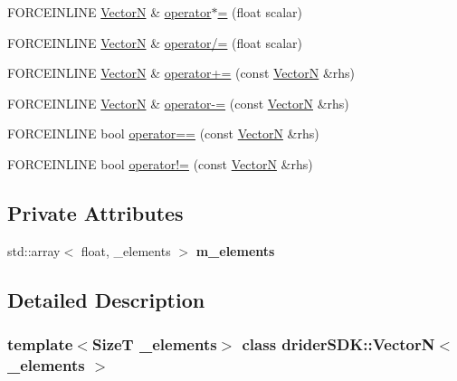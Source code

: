 \begin{DoxyCompactItemize}
\item 
F\+O\+R\+C\+E\+I\+N\+L\+I\+NE \hyperlink{classdrider_s_d_k_1_1_vector_n}{VectorN} \& \hyperlink{classdrider_s_d_k_1_1_vector_n_a9a4739551cb0d3809b77432213dc174e}{operator$\ast$=} (float scalar)
\item 
F\+O\+R\+C\+E\+I\+N\+L\+I\+NE \hyperlink{classdrider_s_d_k_1_1_vector_n}{VectorN} \& \hyperlink{classdrider_s_d_k_1_1_vector_n_accaaea8ae68ab302ab373087d453535e}{operator/=} (float scalar)
\item 
F\+O\+R\+C\+E\+I\+N\+L\+I\+NE \hyperlink{classdrider_s_d_k_1_1_vector_n}{VectorN} \& \hyperlink{classdrider_s_d_k_1_1_vector_n_aeced03636e133a2622be3440ae01af63}{operator+=} (const \hyperlink{classdrider_s_d_k_1_1_vector_n}{VectorN} \&rhs)
\item 
F\+O\+R\+C\+E\+I\+N\+L\+I\+NE \hyperlink{classdrider_s_d_k_1_1_vector_n}{VectorN} \& \hyperlink{classdrider_s_d_k_1_1_vector_n_afa5153ab687f62e42974889f9f3b4b16}{operator-\/=} (const \hyperlink{classdrider_s_d_k_1_1_vector_n}{VectorN} \&rhs)
\item 
F\+O\+R\+C\+E\+I\+N\+L\+I\+NE bool \hyperlink{classdrider_s_d_k_1_1_vector_n_a29db976f9adbfcbee7f88ed80dc039cc}{operator==} (const \hyperlink{classdrider_s_d_k_1_1_vector_n}{VectorN} \&rhs)
\item 
F\+O\+R\+C\+E\+I\+N\+L\+I\+NE bool \hyperlink{classdrider_s_d_k_1_1_vector_n_a3cddf30e8751d5d6f926252e169979d2}{operator!=} (const \hyperlink{classdrider_s_d_k_1_1_vector_n}{VectorN} \&rhs)
\end{DoxyCompactItemize}
\subsection*{Private Attributes}
\begin{DoxyCompactItemize}
\item 
\mbox{\label{classdrider_s_d_k_1_1_vector_n_a127175ab6bcccd0c12590f92db70da4f}} 
std\+::array$<$ float, \+\_\+elements $>$ {\bfseries m\+\_\+elements}
\end{DoxyCompactItemize}


\subsection{Detailed Description}
\subsubsection*{template$<$SizeT \+\_\+elements$>$\newline
class drider\+S\+D\+K\+::\+Vector\+N$<$ \+\_\+elements $>$}

